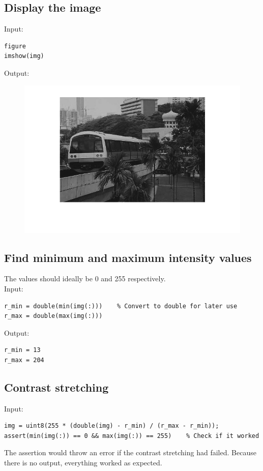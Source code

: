\documentclass[12pt, a4paper]{article}
\begin{document}
\subsection{Display the image}
Input:
\begin{verbatim}
figure
imshow(img)
\end{verbatim}
\newpage
Output:
\begin{figure}[H]
	\centering
	\includegraphics[width=\textwidth]{fig1.png}
\end{figure}
\vspace{-10mm}
\subsection{Find minimum and maximum intensity values}
The values should ideally be 0 and 255 respectively.\\
Input:
\begin{verbatim}
r_min = double(min(img(:)))    % Convert to double for later use
r_max = double(max(img(:)))
\end{verbatim}
Output:
\begin{verbatim}
r_min = 13
r_max = 204
\end{verbatim}
\newpage
\subsection{Contrast stretching}
Input:
\begin{verbatim}
img = uint8(255 * (double(img) - r_min) / (r_max - r_min));
assert(min(img(:)) == 0 && max(img(:)) == 255)    % Check if it worked
\end{verbatim}
The assertion would throw an error if the contrast stretching had failed. Because there is no output, everything worked as expected.
\end{document}
